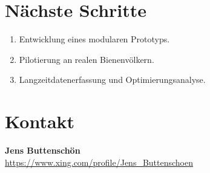 \documentclass[11pt,a4paper]{article}
\begin{document}
\section{N\"achste Schritte}
\begin{enumerate}[topsep=2pt]
  \item Entwicklung eines modularen Prototyps.
  \item Pilotierung an realen Bienenv\"olkern.
  \item Langzeitdatenerfassung und Optimierungsanalyse.
\end{enumerate}

\section*{Kontakt}
\textbf{Jens Buttensch\"on} \\
\small{\url{https://www.xing.com/profile/Jens_Buttenschoen}}
\end{document}

